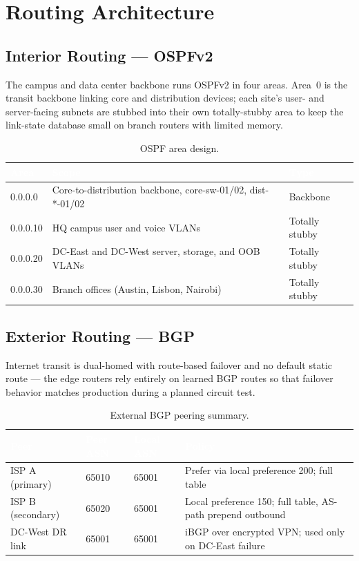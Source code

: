 \documentclass[11pt,a4paper]{report}
\newcommand{\thd}[1]{\textcolor{white}{\textbf{#1}}}
\begin{document}
\chapter{Routing Architecture}

\section{Interior Routing --- OSPFv2}
The campus and data center backbone runs OSPFv2 in four areas. Area~0 is the transit
backbone linking core and distribution devices; each site's user- and server-facing
subnets are stubbed into their own totally-stubby area to keep the link-state database
small on branch routers with limited memory.

\begin{table}[H]
\centering
{}
\begin{tabularx}{\linewidth}{@{}l X l@{}}
\toprule
\rowcolor{navy}
\thd{Area} & \thd{Scope} & \thd{Type} \\
\midrule
0.0.0.0 & Core-to-distribution backbone, core-sw-01/02, dist-*-01/02 & Backbone \\
0.0.0.10 & HQ campus user and voice VLANs & Totally stubby \\
0.0.0.20 & DC-East and DC-West server, storage, and OOB VLANs & Totally stubby \\
0.0.0.30 & Branch offices (Austin, Lisbon, Nairobi) & Totally stubby \\
\bottomrule
\end{tabularx}
\caption{OSPF area design.}
\label{tab:ospf}
\end{table}

\section{Exterior Routing --- BGP}
Internet transit is dual-homed with route-based failover and no default static route ---
the edge routers rely entirely on learned BGP routes so that failover behavior matches
production during a planned circuit test.

\begin{table}[H]
\centering
{}
\begin{tabularx}{\linewidth}{@{}l l l X@{}}
\toprule
\rowcolor{navy}
\thd{Peer} & \thd{Peer ASN} & \thd{Local ASN} & \thd{Policy} \\
\midrule
ISP A (primary)  & 65010 & 65001 & Prefer via local preference 200; full table \\
ISP B (secondary)& 65020 & 65001 & Local preference 150; full table, AS-path prepend outbound \\
DC-West DR link  & 65001 & 65001 & iBGP over encrypted VPN; used only on DC-East failure \\
\bottomrule
\end{tabularx}
\caption{External BGP peering summary.}
\label{tab:bgp}
\end{table}
\end{document}
